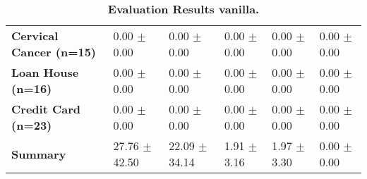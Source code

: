 \begin{table}[htb]
{\begin{tabular}{llllll}
\textbf{Cervical Cancer (n=15)                   } &         \phantom{0}0.00 $\pm$ \phantom{0}0.00 &             \phantom{0}0.00 $\pm$ \phantom{0}0.00 &  \phantom{0}0.00 $\pm$ \phantom{0}0.00 &  \phantom{0}0.00 $\pm$ \phantom{0}0.00 &  \phantom{0}0.00 $\pm$ \phantom{0}0.00 \\
\textbf{Loan House (n=16)                        } &         \phantom{0}0.00 $\pm$ \phantom{0}0.00 &             \phantom{0}0.00 $\pm$ \phantom{0}0.00 &  \phantom{0}0.00 $\pm$ \phantom{0}0.00 &  \phantom{0}0.00 $\pm$ \phantom{0}0.00 &  \phantom{0}0.00 $\pm$ \phantom{0}0.00 \\
\textbf{Credit Card (n=23)                       } &         \phantom{0}0.00 $\pm$ \phantom{0}0.00 &             \phantom{0}0.00 $\pm$ \phantom{0}0.00 &  \phantom{0}0.00 $\pm$ \phantom{0}0.00 &  \phantom{0}0.00 $\pm$ \phantom{0}0.00 &  \phantom{0}0.00 $\pm$ \phantom{0}0.00 \\
\midrule
\textbf{Summary                                  } &                  \phantom{0}27.76 $\pm$ 42.50 &                      \phantom{0}22.09 $\pm$ 34.14 &  \phantom{0}1.91 $\pm$ \phantom{0}3.16 &  \phantom{0}1.97 $\pm$ \phantom{0}3.30 &  \phantom{0}0.00 $\pm$ \phantom{0}0.00 \\
\bottomrule
\end{tabular}%
}
\caption{\textbf{Evaluation Results vanilla.}}
\label{tab:eval-results}
\end{table}


